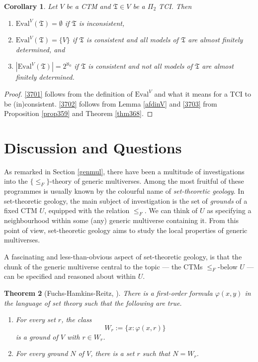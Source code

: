 \documentclass[12pt, twoside]{memoir}
\numberwithin{equation}{section}
\newtheorem{thm}{Theorem}[section]
\newtheorem{cor}[thm]{Corollary}
\theoremstyle{definition}
\theoremstyle{remark}
\theoremstyle{definition}
\theoremstyle{definition}
\theoremstyle{definition}
\theoremstyle{remark}
\begin{document}
\begin{cor}
Let $V$ be a CTM and $\mathfrak{T} \in V$ be a $\Pi_2$ TCI. Then
\begin{enumerate}[label=(\arabic*)]
    \item\label{3701} $\mathrm{Eval}^V(\mathfrak{T}) = \emptyset$ if $\mathfrak{T}$ is inconsistent,
    \item\label{3702} $\mathrm{Eval}^V(\mathfrak{T}) = \{V\}$ if $\mathfrak{T}$ is consistent and all models of $\mathfrak{T}$ are almost finitely determined, and
    \item\label{3703} $|\mathrm{Eval}^V(\mathfrak{T})| = 2^{\aleph_0}$ if $\mathfrak{T}$ is consistent and not all models of $\mathfrak{T}$ are almost finitely determined.
\end{enumerate}
\end{cor}

\begin{proof}
\ref{3701} follows from the definition of $\mathrm{Eval}^V$ and what it means for a TCI to be (in)consistent. \ref{3702} follows from Lemma \ref{afdinV} and \ref{3703} from Proposition \ref{prop359} and Theorem \ref{thm368}.
\end{proof}

\section{Discussion and Questions}

As remarked in Section \ref{genmul}, there have been a multitude of investigations into the $\{\leq_F\}$-theory of generic multiverses. Among the most fruitful of these programmes is usually known by the colourful name of \emph{set-theoretic geology}. In set-theoretic geology, the main subject of investigation is the set of \emph{grounds} of a fixed CTM $U$, equipped with the relation $\leq_F$. We can think of $U$ as specifying a neighbourhood within some (any) generic multiverse containing it. From this point of view, set-theoretic geology aims to study the local properties of generic multiverses.

A fascinating and less-than-obvious aspect of set-theoretic geology, is that the chunk of the generic multiverse central to the topic --- the CTMs $\leq_F$-below $U$ --- can be specified and reasoned about within $U$. 

\begin{thm}[Fuchs-Hamkins-Reitz, \cite{fuchs}]\label{fhr}
There is a first-order formula $\varphi(x, y)$ in the language of set theory such that the following are true.
\begin{enumerate}[label=(\arabic*)]
    \item For every set $r$, the class $$W_r := \{x : \varphi(x, r)\}$$ is a ground of $V$ with $r \in W_r$.
    \item For every ground $N$ of $V$, there is a set $r$ such that $N = W_r$.
\end{enumerate}
\end{thm}
\end{document}
